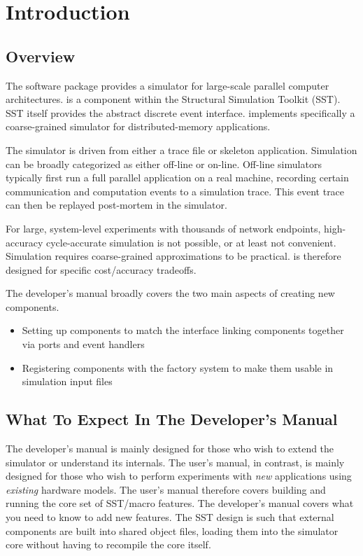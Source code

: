
\chapter{Introduction}\label{chapter:intro}

\section{Overview}
\label{sec:intro:overview}

The \sstmacro software package provides a simulator for large-scale parallel computer architectures.
\sstmacro is a component within the Structural Simulation Toolkit (SST).
SST itself provides the abstract discrete event interface.
\sstmacro implements specifically a coarse-grained simulator for distributed-memory applications. 

The simulator is driven from either a trace file or skeleton application. 
Simulation can be broadly categorized as either off-line or on-line.
Off-line simulators typically first run a full parallel application on a real machine,
recording certain communication and computation events to a simulation trace.
This event trace can then be replayed post-mortem in the simulator.

For large, system-level experiments with thousands of network endpoints, high-accuracy cycle-accurate simulation is not possible,
or at least not convenient.
Simulation requires coarse-grained approximations to be practical.
\sstmacro is therefore designed for specific cost/accuracy tradeoffs.

The developer's manual broadly covers the two main aspects of creating new components.
\begin{itemize}
\item Setting up components to match the  interface linking components together via ports and event handlers
\item Registering components with the factory system to make them usable in simulation input files
\end{itemize}

\section{What To Expect In The Developer's Manual}
The developer's manual is mainly designed for those who wish to extend the simulator or understand its internals.
The user's manual, in contrast, is mainly designed for those who wish to perform experiments with \emph{new} applications using \emph{existing} hardware models.
The user's manual therefore covers building and running the core set of SST/macro features.
The developer's manual covers what you need to know to add new features.
The SST design is such that external components are built into shared object  files,
loading them into the simulator core without having to recompile the core itself.

